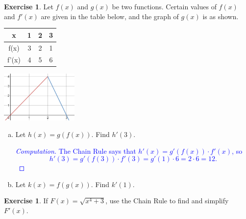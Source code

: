 \documentclass[11pt,reqno,final]{amsart}
\numberwithin{figure}{section}
\theoremstyle{definition} %
\newtheorem{exercise}[question]{Exercise}
\begin{document}
\begin{exercise}
        Let $f(x)$ and $g(x)$ be two functions. Certain values of $f(x)$ and $f'(x)$ are given in the table below, and the graph of $g(x)$ is as shown.\\

        \begin{minipage}{.5\textwidth}
                \begin{center}
                        \begin{tabular}{c|ccc}
                          x&1&2&3\\ \hline
                          f(x) & 3 & 2& 1\\ \hline
                          f'(x) & 4 & 5 & 6
                        \end{tabular}
                \end{center}
        \end{minipage}
        \begin{minipage}{.45\textwidth}
                \begin{center}
                        \includegraphics[width=1.5in]{10-19P_functions.png}
                \end{center}
        \end{minipage}
        \begin{enumerate}[(a)]
        \item Let $h(x) = g(f(x))$. Find $h'(3)$.\\
                \textcolor{blue}{
                  \begin{proof}[Computation]
                          The Chain Rule says that $h'(x) = g'(f(x)) \cdot f'(x)$, so
                          \[
                                  h'(3) = g'(f(3)) \cdot f'(3) = g'(1)\cdot 6 = 2 \cdot 6 = 12.
                          \]
                  \end{proof}
                }
        \item Let $k(x) = f(g(x))$. Find $k'(1)$.
                \vfill
        \end{enumerate}
\end{exercise}

\begin{exercise}
        If $F(x) = \sqrt{x^4+3}$, use the Chain Rule to find and simplify $F'(x)$.
        \vfill
\end{exercise}
\end{document}
